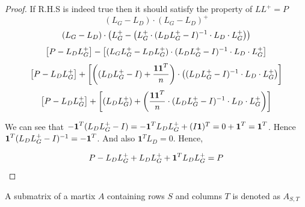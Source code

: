 \begin{proof}
 If R.H.S is indeed true then it should satisfy the property of $LL^+ = P$
 $$ (L_G - L_D) \cdot (L_G - L_D)^+ $$
 $$ (L_G - L_D) \cdot \left(L_{G}^{+} - \left( L_{G}^{+} \cdot (L_DL_{G}^{+}-I)^{-1} \cdot L_D \cdot L_{G}^{+}\right) \right)$$
 $$\left[P - L_DL_{G}^{+} \right] - \left[(L_GL_{G}^{+} - L_DL_{G}^{+}) \cdot (L_DL_{G}^{+}-I)^{-1} \cdot L_D \cdot L_{G}^{+}\right]$$
 $$\left[P - L_DL_{G}^{+} \right] + \left[\left( (L_DL_{G}^{+} - I) + \frac{\textbf{1}\textbf{1}^T}{n} \right) \cdot \left((L_DL_{G}^{+}-I)^{-1} \cdot L_D \cdot L_{G}^{+}\right)\right]$$
 $$\left[P - L_DL_{G}^{+} \right] + \left[ (L_DL_{G}^{+}) + \left(\frac{\textbf{1}\textbf{1}^T}{n} \cdot (L_DL_{G}^{+}-I)^{-1} \cdot L_D \cdot L_{G}^{+} \right) \right]$$
 
 We can see that $-\textbf{1}^T (L_D L_{G}^{+} -I) = -\textbf{1}^T L_D L_{G}^{+} + (I \textbf{1})^T = 0 + \textbf{1}^T = \textbf{1}^T$. Hence $\textbf{1}^T (L_D L_{G}^{+} -I)^{-1} = -\textbf{1}^T$. And also $\textbf{1}^T L_D = 0$. Hence, 
 
 $$ P - L_DL_{G}^{+} + L_DL_{G}^{+} + \textbf{1}^T L_DL_{G}^{+} = P$$

 
\end{proof}

\begin{HXd}[Submatrix]
 A submatrix of a martix $A$ containing rows $S$ and columns $T$ is denoted as $A_{S,T}$
\end{HXd}

